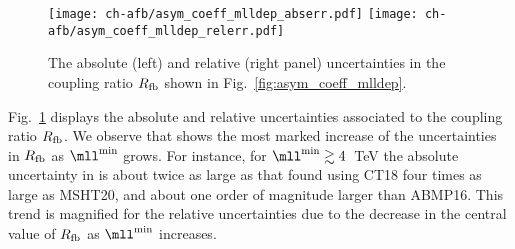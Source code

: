 \begin{figure}[!t]
 \centering
 \texttt{[image: ch-afb/asym\_coeff\_mlldep\_abserr.pdf]}
 \texttt{[image: ch-afb/asym\_coeff\_mlldep\_relerr.pdf]}
 \caption{The absolute (left) and relative (right panel) uncertainties
   in the coupling ratio $R_{\rm fb}$ shown in Fig.~\ref{fig:asym_coeff_mlldep}.
 }    
 \label{fig:asym_coeff_mlldep_err}
\end{figure}

Fig.~\ref{fig:asym_coeff_mlldep_err} displays the 
absolute  and relative  uncertainties
associated to the coupling ratio $R_{\rm fb}$.
%
We observe that  shows
the most marked increase of the uncertainties in $R_{\rm fb}$
as $\mll^{\rm min}$ grows.
%
For instance, for  $\mll^{\rm min}\gtrsim4$~TeV
the absolute \pdf uncertainty in 
is about twice as large as that found using CT18 
four times as large as MSHT20,
and about one order of magnitude larger than ABMP16.
%
This trend is magnified for the relative uncertainties
due to the decrease in the central value of $R_{\rm fb}$
as $\mll^{\rm min}$ increases.
